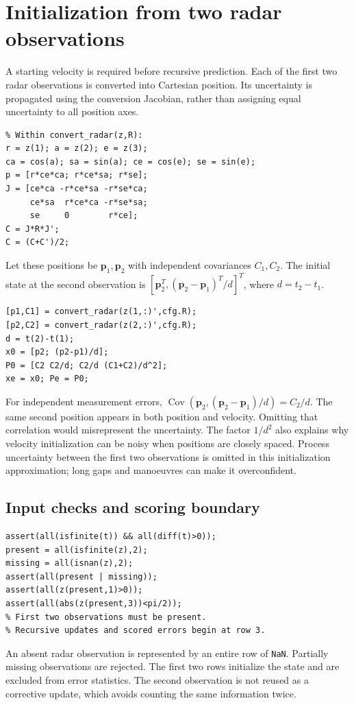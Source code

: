 \documentclass[12pt,a4paper]{article}
\begin{document}
\section{Initialization from two radar observations}
A starting velocity is required before recursive prediction. Each of the first two radar observations is converted into Cartesian position. Its uncertainty is propagated using the conversion Jacobian, rather than assigning equal uncertainty to all position axes.
\begin{lstlisting}
% Within convert_radar(z,R):
r = z(1); a = z(2); e = z(3);
ca = cos(a); sa = sin(a); ce = cos(e); se = sin(e);
p = [r*ce*ca; r*ce*sa; r*se];
J = [ce*ca -r*ce*sa -r*se*ca;
     ce*sa  r*ce*ca -r*se*sa;
     se     0        r*ce];
C = J*R*J';
C = (C+C')/2;
\end{lstlisting}
Let these positions be $\mathbf{p}_1,\mathbf{p}_2$ with independent covariances $C_1,C_2$. The initial state at the second observation is $[\mathbf{p}_2^T,(\mathbf{p}_2-\mathbf{p}_1)^T/d]^T$, where $d=t_2-t_1$.
\begin{lstlisting}
[p1,C1] = convert_radar(z(1,:)',cfg.R);
[p2,C2] = convert_radar(z(2,:)',cfg.R);
d = t(2)-t(1);
x0 = [p2; (p2-p1)/d];
P0 = [C2 C2/d; C2/d (C1+C2)/d^2];
xe = x0; Pe = P0;
\end{lstlisting}
For independent measurement errors, $\operatorname{Cov}(\mathbf p_2,(\mathbf p_2-\mathbf p_1)/d)=C_2/d$. The same second position appears in both position and velocity. Omitting that correlation would misrepresent the uncertainty. The factor $1/d^2$ also explains why velocity initialization can be noisy when positions are closely spaced. Process uncertainty between the first two observations is omitted in this initialization approximation; long gaps and manoeuvres can make it overconfident.

\subsection{Input checks and scoring boundary}
\begin{lstlisting}
assert(all(isfinite(t)) && all(diff(t)>0));
present = all(isfinite(z),2);
missing = all(isnan(z),2);
assert(all(present | missing));
assert(all(z(present,1)>0));
assert(all(abs(z(present,3))<pi/2));
% First two observations must be present.
% Recursive updates and scored errors begin at row 3.
\end{lstlisting}
An absent radar observation is represented by an entire row of \texttt{NaN}. Partially missing observations are rejected. The first two rows initialize the state and are excluded from error statistics. The second observation is not reused as a corrective update, which avoids counting the same information twice.
\clearpage
\end{document}
